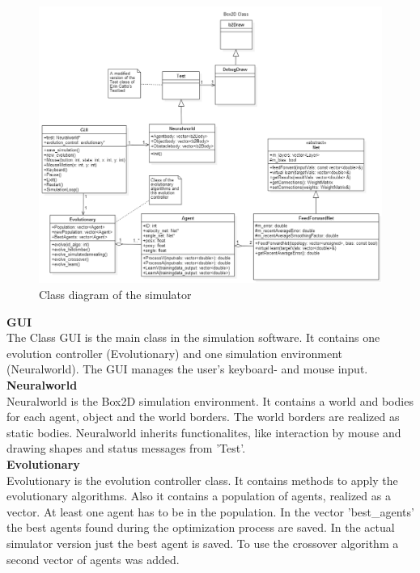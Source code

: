 \documentclass[10pt,a4paper,DIV=11]{scrreprt}
\begin{document}
\begin{center}
	\begin{figure}[H]
		\centering
		\includegraphics[width=1.0\textwidth,scale=1.0]{files/ClassDiagram1.png}
		\caption{Class diagram of the simulator}
		\label{fig:usecases}
	\end{figure}
\end{center}

\textbf{GUI} \\
The Class GUI is the main class in the simulation software. It contains one evolution controller (Evolutionary) and one simulation environment (Neuralworld).
The GUI manages the user's keyboard- and mouse input. \\

\textbf{Neuralworld} \\
Neuralworld is the Box2D simulation environment. It contains a world and bodies for each agent, object and the world borders.
The world borders are realized as static bodies. Neuralworld inherits functionalites, like interaction by mouse and drawing shapes and status messages from 'Test'. \\

\textbf{Evolutionary} \\
Evolutionary is the evolution controller class. It contains methods to apply the evolutionary algorithms. Also it contains a population of agents, realized as a vector. At least one agent has to be in the population.
In the vector 'best\_agents' the best agents found during the optimization process are saved. In the actual simulator version just the best agent is saved. To use the crossover algorithm a second vector of agents was added. \\
\end{document}
